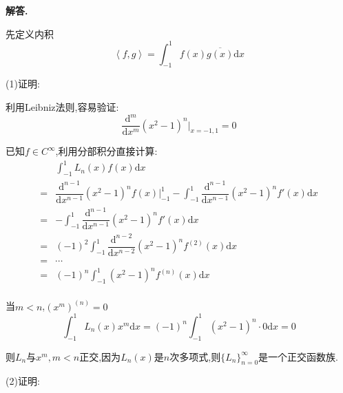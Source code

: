 \documentclass[12pt, a4paper, oneside]{ctexart}
\newenvironment{solution}{\par\noindent\textbf{解答. }}{\par}
\begin{document}
\begin{solution}
\par
先定义内积
$$
\left \langle f, g\right \rangle=\int_{-1}^{1}f(x)\overline{g(x)}\mathrm{d}x
$$

\par
(1)证明:
\par
利用Leibniz法则,容易验证:
$$
\dfrac{\mathrm{d}^m}{\mathrm{d}x^m}(x^2-1)^n \bigg|_{x=-1,1}=0
$$
\par
已知$f\in C^{\infty}$,利用分部积分直接计算:
$$
\begin{aligned}
&\int_{-1}^{1}L_n(x)f(x)\mathrm{d}x\\
=&\dfrac{\mathrm{d}^{n-1}}{\mathrm{d}x^{n-1}}(x^2-1)^nf(x)\bigg|^1_{-1}
-\int_{-1}^{1}\dfrac{\mathrm{d}^{n-1}}{\mathrm{d}x^{n-1}}(x^2-1)^nf'(x)\mathrm{d}x\\
=&-\int_{-1}^{1}\dfrac{\mathrm{d}^{n-1}}{\mathrm{d}x^{n-1}}(x^2-1)^nf'(x)\mathrm{d}x\\
=&(-1)^2\int_{-1}^{1}\dfrac{\mathrm{d}^{n-2}}{\mathrm{d}x^{n-2}}(x^2-1)^nf^{(2)}(x)\mathrm{d}x\\
=&\cdots\\
=&(-1)^n\int_{-1}^{1}(x^2-1)^nf^{(n)}(x)\mathrm{d}x\\
\end{aligned}
$$
\par
当$m<n$,$(x^m)^{(n)}=0$
$$
\int_{-1}^{1}L_n(x)x^m\mathrm{d}x=(-1)^n\int_{-1}^{1}(x^2-1)^n\cdot 0\mathrm{d}x=0
$$
\par
则$L_n$与$x^m,m<n$正交,因为$L_n(x)$是$n$次多项式,则$\{L_n\}_{n=0}^{\infty}$是一个正交函数族.
\par
(2)证明:


\end{solution}
\end{document}
